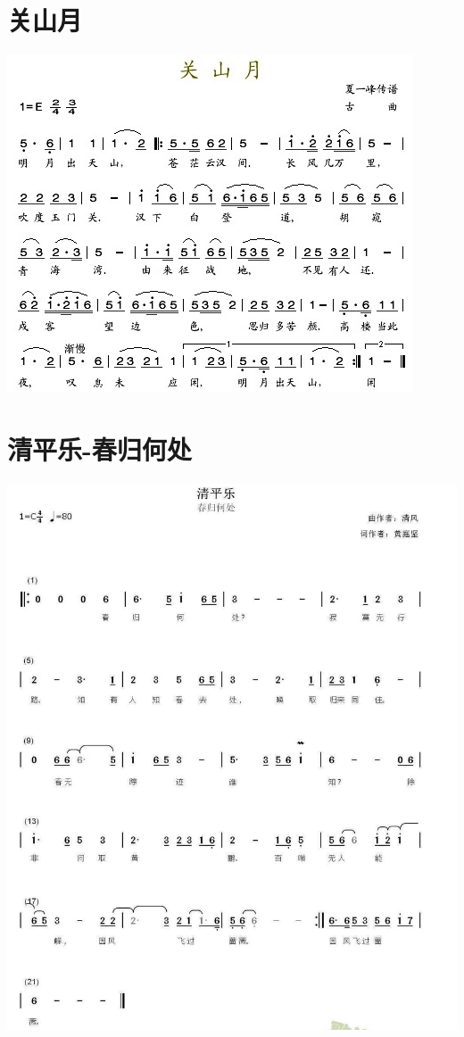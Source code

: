 \documentclass[cn,pad,chinesefont=nofont,twocol]{elegantbook}
\begin{document}
\section{关山月}
    \includegraphics[width=\textwidth]{dongxiao/20200411-清平乐-关山月.jpg}
\section{清平乐-春归何处}
    \includegraphics[width=\textwidth]{dongxiao/20200411-清平乐-春归何处.jpg}
\end{document}
